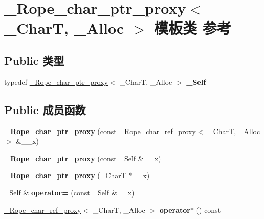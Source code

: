 \hypertarget{class___rope__char__ptr__proxy}{}\section{\+\_\+\+Rope\+\_\+char\+\_\+ptr\+\_\+proxy$<$ \+\_\+\+CharT, \+\_\+\+Alloc $>$ 模板类 参考}
\label{class___rope__char__ptr__proxy}
\subsection*{Public 类型}
\begin{DoxyCompactItemize}
\item 
\mbox{\label{class___rope__char__ptr__proxy_a2e4ba5be28db90643acbc394949aee3f}} 
typedef \hyperlink{class___rope__char__ptr__proxy}{\+\_\+\+Rope\+\_\+char\+\_\+ptr\+\_\+proxy}$<$ \+\_\+\+CharT, \+\_\+\+Alloc $>$ {\bfseries \+\_\+\+Self}
\end{DoxyCompactItemize}
\subsection*{Public 成员函数}
\begin{DoxyCompactItemize}
\item 
\mbox{\label{class___rope__char__ptr__proxy_ad3fbf9746e589db35dcfbf582f949989}} 
{\bfseries \+\_\+\+Rope\+\_\+char\+\_\+ptr\+\_\+proxy} (const \hyperlink{class___rope__char__ref__proxy}{\+\_\+\+Rope\+\_\+char\+\_\+ref\+\_\+proxy}$<$ \+\_\+\+CharT, \+\_\+\+Alloc $>$ \&\+\_\+\+\_\+x)
\item 
\mbox{\label{class___rope__char__ptr__proxy_ae39e5b5bbe3e0e98e2333f0cd3e28651}} 
{\bfseries \+\_\+\+Rope\+\_\+char\+\_\+ptr\+\_\+proxy} (const \hyperlink{class___rope__char__ptr__proxy}{\+\_\+\+Self} \&\+\_\+\+\_\+x)
\item 
\mbox{\label{class___rope__char__ptr__proxy_aab745b5874e04d60df4c141f025eb0c8}} 
{\bfseries \+\_\+\+Rope\+\_\+char\+\_\+ptr\+\_\+proxy} (\+\_\+\+CharT $\ast$\+\_\+\+\_\+x)
\item 
\mbox{\label{class___rope__char__ptr__proxy_aff4bffeb0f9a06a0c5bc977bbcdb9201}} 
\hyperlink{class___rope__char__ptr__proxy}{\+\_\+\+Self} \& {\bfseries operator=} (const \hyperlink{class___rope__char__ptr__proxy}{\+\_\+\+Self} \&\+\_\+\+\_\+x)
\item 
\mbox{\label{class___rope__char__ptr__proxy_a6d5989f6a07a070ee2e1dfa8a47faf88}} 
\hyperlink{class___rope__char__ref__proxy}{\+\_\+\+Rope\+\_\+char\+\_\+ref\+\_\+proxy}$<$ \+\_\+\+CharT, \+\_\+\+Alloc $>$ {\bfseries operator$\ast$} () const
\end{DoxyCompactItemize}
